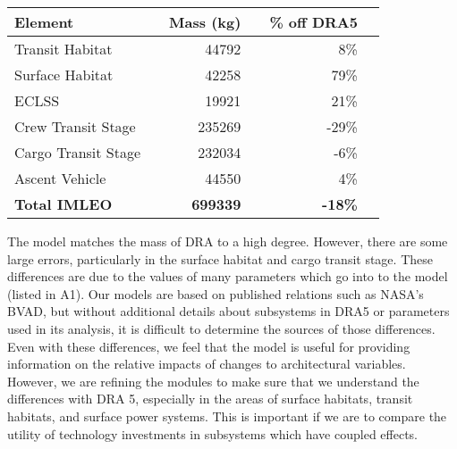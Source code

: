 \documentclass[]{scrartcl}
\begin{document}
\begin{center}
	\begin{tabular}{ lc rc rc}
		\textbf{Element} && \textbf{Mass (kg)} && \textbf{\% off DRA5} \\\hline
		Transit Habitat && 44792 && 8\% \\
		Surface Habitat && 42258 && 79\% \\
		ECLSS && 19921 && 21\% \\
		Crew Transit Stage && 235269 && -29\% \\
		Cargo Transit Stage && 232034 && -6\% \\
		Ascent Vehicle && 44550 && 4\% \\
		\textbf{Total IMLEO} && \textbf{699339} && \textbf{-18\%} \\
	\end{tabular}
\end{center}
The model matches the mass of DRA to a high degree. However, there are some large errors, particularly in the surface habitat and cargo transit stage. These differences are due to the values of many parameters which go into to the model (listed in A1). Our models are based on published relations such as NASA's BVAD, but without additional details about subsystems in DRA5 or parameters used in its analysis, it is difficult to determine the sources of those differences. \hfill \break
Even with these differences, we feel that the model is useful for providing information on the relative impacts of changes to architectural variables. However, we are refining the modules to make sure that we understand the differences with DRA 5, especially in the areas of surface habitats, transit habitats, and surface power systems. This is important if we are to compare the utility of technology investments in subsystems which have coupled effects. 
\end{document}
